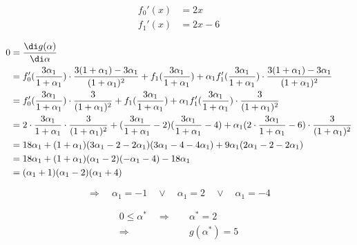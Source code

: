\begin{align*}
f_0'(x) &= 2x \\
f_1'(x) &= 2x-6
\end{align*}

\begin{align*}
0 &= \frac{\di g(\alpha)}{\di \alpha} \\
  &= f_0'(\frac{3 \alpha_1}{1+\alpha_1}) \cdot \frac{3(1+\alpha_1) - 3 \alpha_1}{(1+\alpha_1)^2} + f_1(\frac{3 \alpha_1}{1+\alpha_1}) + \alpha_1 f_1'(\frac{3 \alpha_1}{1+\alpha_1}) \cdot \frac{3(1+\alpha_1) - 3 \alpha_1}{(1+\alpha_1)^2} \\
  &= f_0'(\frac{3 \alpha_1}{1+\alpha_1}) \cdot \frac{3}{(1+\alpha_1)^2} + f_1(\frac{3 \alpha_1}{1+\alpha_1}) + \alpha_1 f_1'(\frac{3 \alpha_1}{1+\alpha_1}) \cdot \frac{3}{(1+\alpha_1)^2} \\
  &= 2 \cdot \frac{3 \alpha_1}{1+\alpha_1} \cdot \frac{3}{(1+\alpha_1)^2} + (\frac{3\alpha_1}{1+\alpha_1} - 2)(\frac{3\alpha_1}{1+\alpha_1}-4) + \alpha_1 (2 \cdot \frac{3\alpha_1}{1+\alpha_1}-6) \cdot \frac{3}{(1+\alpha_1)^2} \\
  &= 18 \alpha_1 + (1+\alpha_1)(3 \alpha_1 - 2-2\alpha_1)(3\alpha_1-4-4\alpha_1) + 9 \alpha_1 (2\alpha_1-2-2\alpha_1) \\
  &= 18 \alpha_1 + (1+\alpha_1)(\alpha_1-2)(-\alpha_1-4) - 18 \alpha_1 \\
  &= (\alpha_1+1)(\alpha_1-2)(\alpha_1+4)
\end{align*}

\[ \Rightarrow \quad \alpha_1 = -1 \quad \lor \quad \alpha_1 = 2 \quad \lor \quad \alpha_1 = -4 \]

\begin{align*}
0 \leq \alpha^* \quad \Rightarrow \quad & \alpha^* = 2 \\
\Rightarrow \quad & g(\alpha^*) = 5
\end{align*}

